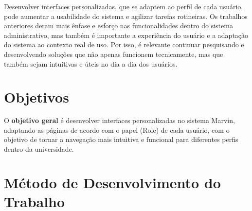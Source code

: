 Desenvolver interfaces personalizadas, que se adaptem ao perfil de cada usuário, pode aumentar a usabilidade do sistema e agilizar tarefas rotineiras. Os trabalhos anteriores deram mais ênfase e esforço nas funcionalidades dentro do sistema administrativo, mas também é importante a experiência do usuário e a adaptação do sistema ao contexto real de uso. Por isso, é relevante continuar pesquisando e desenvolvendo soluções que não apenas funcionem tecnicamente, mas que também sejam intuitivas e úteis no dia a dia dos usuários.

\section{Objetivos}
\label{sec-intro-obj}



O \textbf{objetivo geral} é desenvolver interfaces personalizadas no sistema Marvin, adaptando as páginas de acordo com o papel (Role) de cada usuário, com o objetivo de tornar a navegação mais intuitiva e funcional para diferentes perfis dentro da universidade.




\section{Método de Desenvolvimento do Trabalho}
\label{sec-intro-met}


